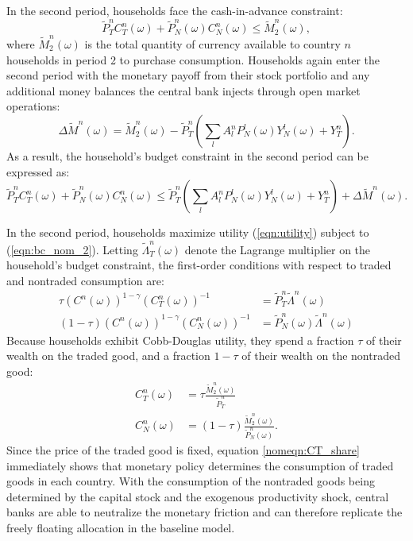 In the second period, households face the cash-in-advance constraint:
\begin{equation*}
  \tilde{P}^n_T C^n_T(\omega) + \tilde{P}^n_N(\omega) C^n_N(\omega)
  \le \tilde M_2^n(\omega),
\end{equation*}
where $\tilde M_2^n(\omega)$ is the total quantity of currency
available to country $n$ households in period 2 to purchase
consumption. Households again enter the second period with the
monetary payoff from their stock portfolio and any additional money
balances the central bank injects through open market operations:
\begin{equation*}
  \Delta \tilde M^n(\omega)
  = \tilde{M}^n_2(\omega) - \tilde{P}^n_T
  \left( \sum_l A^n_l P^l_N(\omega)Y^l_N(\omega) + Y^n_T \right).
\end{equation*}
As a result, the household's budget constraint in the second period
can be expressed as:
\begin{equation}
  \tilde{P}^n_T C^n_T(\omega)
  + \tilde{P}^n_N(\omega) C^n_N(\omega)
  \le  \tilde{P}^n_T
  \left( \sum_l A^n_l P^l_N(\omega)Y^l_N(\omega) + Y^n_T \right) +
  \Delta \tilde M^n(\omega).
  \label{eqn:bc_nom_2}
\end{equation}

In the second period, households maximize utility (\ref{eqn:utility})
subject to (\ref{eqn:bc_nom_2}). Letting $\tilde{\Lambda}^n_T(\omega)$
denote the Lagrange multiplier on the household's budget constraint,
the first-order conditions with respect to traded and nontraded
consumption are:
\begin{align}
  \tau \left( C^n(\omega) \right)^{1 - \gamma} \left( C^n_T(\omega) \right)^{-1}
  & = \tilde{P}^n_T \tilde{\Lambda}^n(\omega) 
    \label{nomeqn:FOCT} \\
  (1 - \tau) \left( C^n(\omega) \right)^{1 - \gamma} \left( C^n_N(\omega) \right)^{-1}
  & = \tilde{P}^n_N(\omega) \tilde{\Lambda}^n(\omega) 
    \label{nomeqn:FOCN}
\end{align}
Because households exhibit Cobb-Douglas utility, they spend a fraction
$\tau$ of their wealth on the traded good, and a fraction $1 - \tau$
of their wealth on the nontraded good:
\begin{align}
  C^n_T(\omega)
  &= \tau \frac{\tilde{M}^n_2(\omega)}{\tilde{P}^n_T} 
    \label{nomeqn:CT_share} \\
  C^n_N(\omega)
  &= (1 - \tau) \frac{\tilde{M}^n_2(\omega)}{\tilde{P}^n_N(\omega)}. 
    \label{nomeqn:CN_share}
\end{align}
Since the price of the traded good is fixed, equation
\eqref{nomeqn:CT_share} immediately shows that monetary policy
determines the consumption of traded goods in each country. With the
consumption of the nontraded goods being determined by the capital
stock and the exogenous productivity shock, central banks are able to
neutralize the monetary friction and can therefore replicate the
freely floating allocation in the baseline model.

